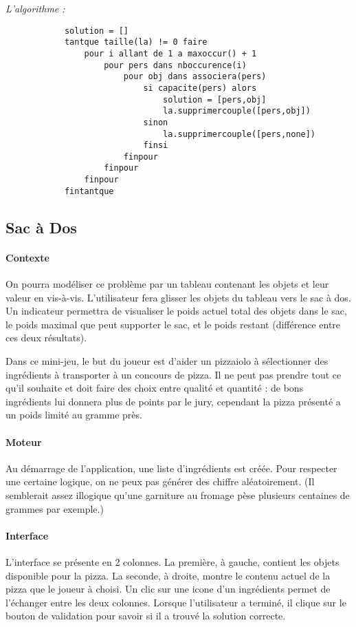 			\emph{L'algorithme :}

			\begin{lstlisting}
			solution = []
			tantque taille(la) != 0 faire
				pour i allant de 1 a maxoccur() + 1
					pour pers dans nboccurence(i)
						pour obj dans associera(pers)
							si capacite(pers) alors
								solution = [pers,obj]
								la.supprimercouple([pers,obj])
							sinon
								la.supprimercouple([pers,none])
							finsi
						finpour
					finpour
				finpour
			fintantque
			\end{lstlisting}





    \subsection{Sac à Dos}
        \paragraph{Contexte}
        On pourra modéliser ce problème par un tableau contenant les objets et leur
        valeur en vis-à-vis. L'utilisateur fera glisser les objets du tableau vers
        le sac à dos. Un indicateur permettra de visualiser le poids actuel total
        des objets dans le sac, le poids maximal que peut supporter le sac, et le
        poids restant (différence entre ces deux résultats).

            Dans ce mini-jeu, le but du joueur est d'aider un pizzaiolo à
            sélectionner des ingrédients à transporter à un concours de pizza.
            Il ne peut pas prendre tout ce qu'il souhaite et doit faire des
            choix entre qualité et quantité : de bons ingrédients lui donnera
            plus de points par le jury, cependant la pizza présenté a un poids
            limité au gramme près.
        \paragraph{Moteur}
            Au démarrage de l'application, une liste d'ingrédients est créée.
            Pour respecter une certaine logique, on ne peux pas générer des
            chiffre aléatoirement. (Il semblerait assez illogique qu'une
            garniture au fromage pèse plusieurs centaines de grammes par
            exemple.)
        \paragraph{Interface}
            L'interface se présente en 2 colonnes. La première, à gauche,
            contient les objets disponible pour la pizza. La seconde, à droite,
            montre le contenu actuel de la pizza que le joueur à choisi.
            Un clic sur une icone d'un ingrédients permet de l'échanger entre
            les deux colonnes.
            Lorsque l'utilisateur a terminé, il clique sur le bouton de
            validation pour savoir si il a trouvé la solution correcte.

